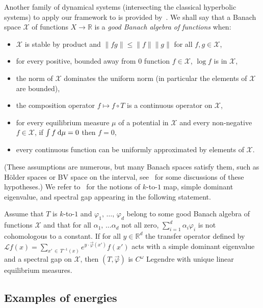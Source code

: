 \documentclass[AHL, Unicode, longabstracts,published]{cedram}
\theoremstyle{plain}
\theoremstyle{plain}
\newcommand\vpot{\vec\pot}
\newcommand*{\dd} {\relax\ifnum\lastnodetype>0\mskip\medmuskip\fi\mathrm{d}}
\newcommand{\pot}{\varphi}
\newcommand*\8{\infty}
\newcommand\RR{\mathbb{R}}
\newcommand{\CL}{\mathcal{L}}
\newcommand{\scX}{\mathscr{X}}
\begin{document}
Another family of dynamical systems (intersecting the classical hyperbolic systems) to apply our framework to is provided by~\cite[Corollary~B, Theorems~F \& G]{GKLM}. We shall say that a Banach space $\scX$ of functions $X\to \RR$ is a \emph{good Banach algebra of functions} when:
\begin{itemize}
\item $\scX$ is stable by product and $\lVert fg\rVert \le \lVert f\rVert \lVert g\rVert$ for all $f,g\in\scX$,
\item for every positive, bounded away from $0$ function $f\in\scX$, $\log f$ is in $\scX$,
\item the norm of $\scX$ dominates the uniform norm (in particular the elements of $\scX$ are bounded),
\item the composition operator $f\mapsto f\circ T$ is a continuous operator on $\scX$,
\item for every equilibrium measure $\mu$ of a potential in $\scX$ and every non-negative $f\in\scX$, if $\int f\dd\mu = 0$ then $f=0$,
\item every continuous function can be uniformly approximated by elements of $\scX$.
\end{itemize}
(These assumptions are numerous, but many Banach spaces satisfy them, such as H\"older spaces or BV space on the interval, see~\cite{GKLM} for some discussions of these hypotheses.) We refer to~\cite{GKLM} for the notions of $k$-to-$1$ map, simple dominant eigenvalue, and spectral gap appearing in the following statement.

\begin{theo}\label{thm-classical-are-Legendre}
Assume that $T$ is $k$-to-$1$ and $\pot_1,\,\dots,\, \pot_d$ belong to some good Banach algebra of functions $\scX$ and that for all $\alpha_1,\,\dots\alpha_d$ not all zero, $\sum_{i=1}^d \alpha_i\pot_i$ is not cohomologous to a constant. If for all $ y\in\RR^d$ the transfer operator defined by $\CL f (x) = \sum_{x'\,\in\,T^{-1}(x)} e^{ y\cdot\vpot(x')} f(x')$ acts with a simple dominant eigenvalue and a spectral gap on $\scX$, then $(T,\vpot)$ is $C^\omega$ Legendre with unique linear equilibrium measures.
\end{theo}



\subsection{Examples of energies}\label{subsec-examples}
\end{document}
